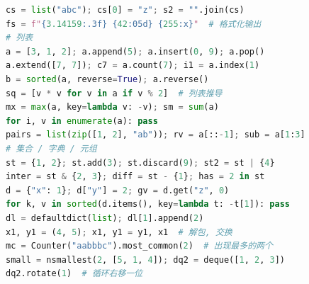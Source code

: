 \begin{lstlisting}[language=Python]
cs = list("abc"); cs[0] = "z"; s2 = "".join(cs)
fs = f"{3.14159:.3f} {42:05d} {255:x}"  # 格式化输出
# 列表
a = [3, 1, 2]; a.append(5); a.insert(0, 9); a.pop()
a.extend([7, 7]); c7 = a.count(7); i1 = a.index(1)
b = sorted(a, reverse=True); a.reverse()
sq = [v * v for v in a if v % 2]  # 列表推导
mx = max(a, key=lambda v: -v); sm = sum(a)
for i, v in enumerate(a): pass
pairs = list(zip([1, 2], "ab")); rv = a[::-1]; sub = a[1:3]
# 集合 / 字典 / 元组
st = {1, 2}; st.add(3); st.discard(9); st2 = st | {4}
inter = st & {2, 3}; diff = st - {1}; has = 2 in st
d = {"x": 1}; d["y"] = 2; gv = d.get("z", 0)
for k, v in sorted(d.items(), key=lambda t: -t[1]): pass
dl = defaultdict(list); dl[1].append(2)
x1, y1 = (4, 5); x1, y1 = y1, x1  # 解包, 交换
mc = Counter("aabbbc").most_common(2)  # 出现最多的两个
small = nsmallest(2, [5, 1, 4]); dq2 = deque([1, 2, 3])
dq2.rotate(1)  # 循环右移一位
\end{lstlisting}
